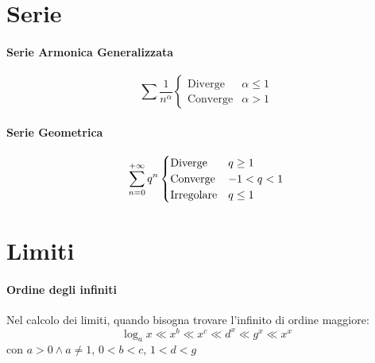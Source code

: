 \documentclass[12pt, a4paper, openany]{book}
\begin{document}
\section*{Serie}
\paragraph*{Serie Armonica Generalizzata}
\begin{equation*}
	\sum \frac{1}{n^\alpha} \begin{cases}
		\text{Diverge} & \alpha\leq 1\\
		\text{Converge} & \alpha> 1
	\end{cases}
\end{equation*}
\paragraph*{Serie Geometrica}
\begin{equation*}
	\sum_{n=0}^{+\infty} q^n \begin{cases}
		\text{Diverge} & q\geq 1\\
		\text{Converge} & -1<q<1 \\
		\text{Irregolare} & q\leq 1
	\end{cases}
\end{equation*}
\section*{Limiti}
\paragraph*{Ordine degli infiniti}
Nel calcolo dei limiti, quando bisogna trovare l'infinito di ordine maggiore:
$$ \log_ax\ll x^b\ll x^c\ll d^x\ll g^x\ll x^x $$
con $a>0 \wedge a\neq 1$, $0<b<c$, $1<d<g$
\end{document}
